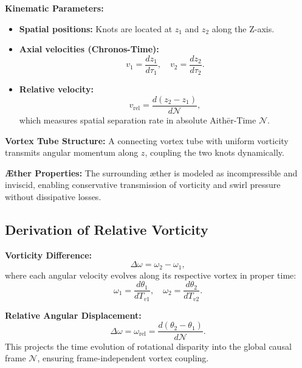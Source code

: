 \documentclass[a4paper,12pt]{article}
\begin{document}
    \textbf{Kinematic Parameters:}
    \begin{itemize}
        \item \textbf{Spatial positions:} Knots are located at \( z_1 \) and \( z_2 \) along the Z-axis.
        \item \textbf{Axial velocities (Chronos-Time):}
        \begin{equation*}
            v_1 = \frac{dz_1}{d\tau_1}, \quad v_2 = \frac{dz_2}{d\tau_2}.
        \end{equation*}
        \item \textbf{Relative velocity:}
        \begin{equation*}
            v_\text{rel} = \frac{d(z_2 - z_1)}{d\mathcal{N}},
        \end{equation*}
        which measures spatial separation rate in absolute Aithēr-Time \( \mathcal{N} \).
    \end{itemize}

    \textbf{Vortex Tube Structure:} A connecting vortex tube with uniform vorticity transmits angular momentum along \( z \), coupling the two knots dynamically.

    \textbf{Æther Properties:} The surrounding æther is modeled as incompressible and inviscid, enabling conservative transmission of vorticity and swirl pressure without dissipative losses.

    \subsection{Derivation of Relative Vorticity}

    \textbf{Vorticity Difference:}
    \begin{equation*}
        \Delta \omega = \omega_2 - \omega_1,
    \end{equation*}
    where each angular velocity evolves along its respective vortex in proper time:
    \begin{equation*}
        \omega_1 = \frac{d\theta_1}{dT_{v1}}, \quad \omega_2 = \frac{d\theta_2}{dT_{v2}}.
    \end{equation*}

    \textbf{Relative Angular Displacement:}
    \begin{equation*}
        \Delta \omega = \omega_\text{rel} = \frac{d(\theta_2 - \theta_1)}{d\mathcal{N}}.
    \end{equation*}
    This projects the time evolution of rotational disparity into the global causal frame \( \mathcal{N} \), ensuring frame-independent vortex coupling.
\end{document}
